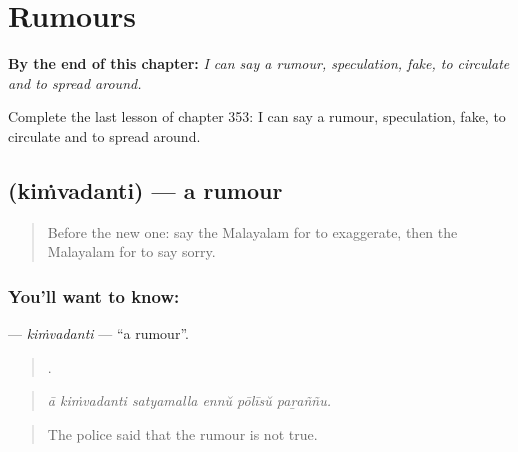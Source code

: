 
\chapter{Rumours}
\label{ch:ml-rumours}

\begin{chapteropening}
\textbf{By the end of this chapter:} \emph{I can say a rumour, speculation, fake, to circulate and to spread around.}

Complete the last lesson of chapter 353: I can say a rumour, speculation, fake, to circulate and to spread around.
\end{chapteropening}

\section[\texorpdfstring{\ml{കിംവദന്തി} (kiṁvadanti)}{കിംവദന്തി (kiṁvadanti)}]{ (kiṁvadanti) — a rumour}

\label{lesson:ML-C353-kimvadanti}



\begin{quote}
Before the new one: say the Malayalam for to exaggerate, then the Malayalam for to say sorry.
\end{quote}

\subsection*{You'll want to know: }
\textbf{} — \emph{kiṁvadanti} — \textquotedblleft{}a rumour\textquotedblright{}.

\begin{quote}
     .
\end{quote}

\begin{quote}
\emph{ā kiṁvadanti satyamalla ennŭ pōlīsŭ paṟaññu.}
\end{quote}

\begin{quote}
The police said that the rumour is not true.
\end{quote}

